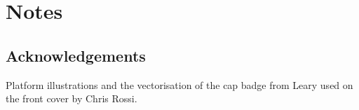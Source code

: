 \part{Notes}

\chapter{Acknowledgements}

Platform illustrations and the vectorisation of the cap badge from Leary used on the front cover by Chris Rossi.



